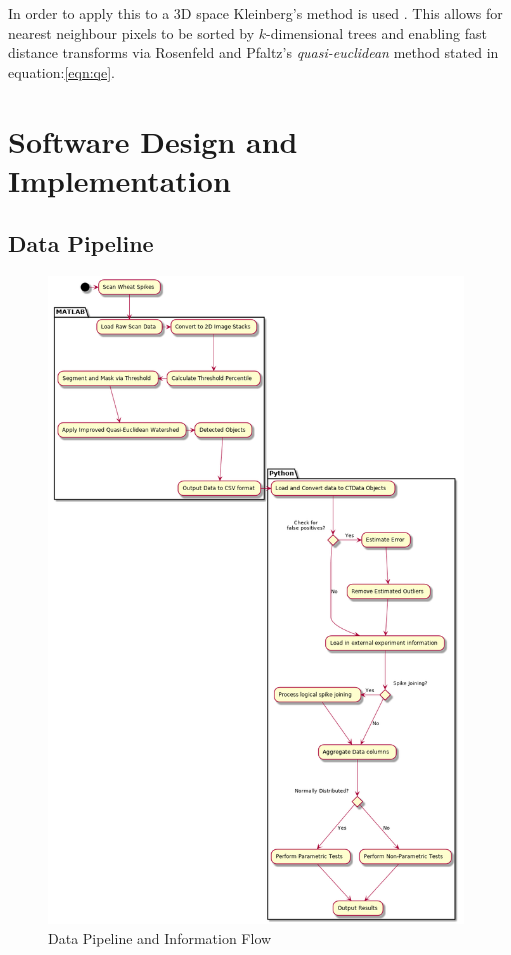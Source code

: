 \documentclass[11pt]{report}
\begin{document}
In order to apply this to a 3D space Kleinberg's method is used  \cite{Kleinberg1997}. This allows for nearest neighbour pixels to be sorted by $k$-dimensional trees
and enabling fast distance transforms via Rosenfeld and Pfaltz's \emph{quasi-euclidean} method stated in equation:\ref{eqn:qe}.

\chapter{Software Design and Implementation}
\label{sec-3}

\section{Data Pipeline}
\label{sec-3-1}

\begin{center}
\begin{figure}[htb]
\centering
\includegraphics[width=11cm]{./images/pipeline.png}
\caption{\label{fig:pipeline}Data Pipeline and Information Flow}
\end{figure}
\end{center}
\end{document}
